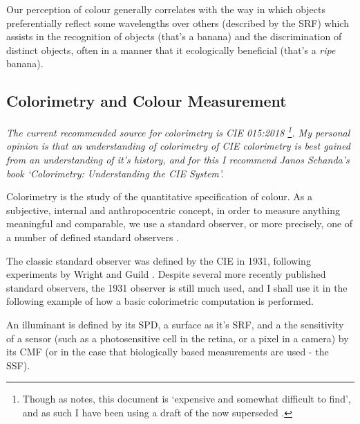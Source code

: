 Our perception of colour generally correlates with the way in which objects preferentially reflect some wavelengths over others (described by the \acrfull{SRF}) which assists in the recognition of objects (that's a banana) and the discrimination of distinct objects, often in a manner that it ecologically beneficial (that's a \emph{ripe} banana).

\subsection{Colorimetry and Colour Measurement}

\textit{The current recommended source for colorimetry is CIE 015:2018 \citep{cie_cie_2018}\footnote{Though as \citet{fairchild_cie_2019} notes, this document is `expensive and somewhat difficult to find', and as such I have been using a draft of the now superseded \citet{cie_cie_2004-2}.}. My personal opinion is that an understanding of colorimetry of CIE colorimetry is best gained from an understanding of it's history, and for this I recommend Janos Schanda's book `Colorimetry: Understanding the CIE System'\citep{schanda_colorimetry_2007}.}

Colorimetry is the study of the quantitative specification of colour. As a subjective, internal and anthropocentric concept, in order to measure anything meaningful and comparable, we use a standard observer, or more precisely, one of a number of defined standard observers \cite{cie_bs_2011}.

The classic standard observer was defined by the CIE in 1931, following experiments by Wright and Guild \cite{wright_re-determination_1929, guild_colorimetric_1931}. Despite several more recently published standard observers, the 1931 observer is still much used, and I shall use it in the following example of how a basic colorimetric computation is performed.

An illuminant is defined by its \gls{SPD}, a surface as it's \gls{SRF}, and a the sensitivity of a sensor (such as a photosensitive cell in the retina, or a pixel in a camera) by its \gls{CMF} (or in the case that biologically based measurements are used - the \gls{SSF}).

